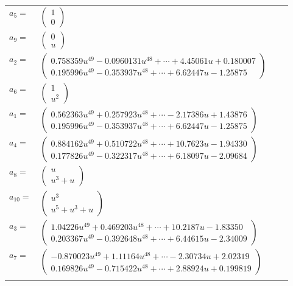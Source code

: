 \documentclass[1p]{elsarticle_modified}
\theoremstyle{definition}
\begin{document}
\begin{tabular}{m{7pt} m{180pt} m{7pt} m{180pt} }
\flushright $a_{5}=$&$\begin{pmatrix}1\\0\end{pmatrix}$ \\
\flushright $a_{9}=$&$\begin{pmatrix}0\\u\end{pmatrix}$ \\
\flushright $a_{2}=$&$\begin{pmatrix}0.758359 u^{49}-0.0960131 u^{48}+\cdots+4.45061 u+0.180007\\0.195996 u^{49}-0.353937 u^{48}+\cdots+6.62447 u-1.25875\end{pmatrix}$ \\
\flushright $a_{6}=$&$\begin{pmatrix}1\\u^2\end{pmatrix}$ \\
\flushright $a_{1}=$&$\begin{pmatrix}0.562363 u^{49}+0.257923 u^{48}+\cdots-2.17386 u+1.43876\\0.195996 u^{49}-0.353937 u^{48}+\cdots+6.62447 u-1.25875\end{pmatrix}$ \\
\flushright $a_{4}=$&$\begin{pmatrix}0.884162 u^{49}+0.510722 u^{48}+\cdots+10.7623 u-1.94330\\0.177826 u^{49}-0.322317 u^{48}+\cdots+6.18097 u-2.09684\end{pmatrix}$ \\
\flushright $a_{8}=$&$\begin{pmatrix}u\\u^3+u\end{pmatrix}$ \\
\flushright $a_{10}=$&$\begin{pmatrix}u^3\\u^5+u^3+u\end{pmatrix}$ \\
\flushright $a_{3}=$&$\begin{pmatrix}1.04226 u^{49}+0.469203 u^{48}+\cdots+10.2187 u-1.83350\\0.203367 u^{49}-0.392648 u^{48}+\cdots+6.44615 u-2.34009\end{pmatrix}$ \\
\flushright $a_{7}=$&$\begin{pmatrix}-0.870023 u^{49}+1.11164 u^{48}+\cdots-2.30734 u+2.02319\\0.169826 u^{49}-0.715422 u^{48}+\cdots+2.88924 u+0.199819\end{pmatrix}$\\&\end{tabular}
\end{document}

